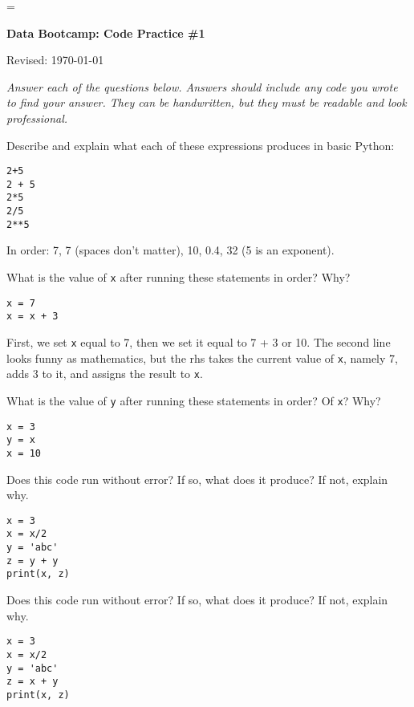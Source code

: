 \documentclass[11pt]{exam}
\begin{document}
\parskip=\bigskipamount
\parindent=0.0in
\thispagestyle{empty}


\bigskip\bigskip
\centerline{\Large \bf Data Bootcamp:  Code Practice \#1}
\centerline{Revised: \today}

{\it Answer each of the questions below.
Answers should include any code you wrote to find your answer.
They can be handwritten, but they must be readable and look professional.}

\begin{questions}
\item Describe and explain what each of these expressions produces in basic Python:
\begin{verbatim}
2+5
2 + 5
2*5
2/5
2**5
\end{verbatim}

\begin{solution}
In order:  7, 7 (spaces don't matter), 10, 0.4, 32 (5 is an exponent).
\end{solution}

\item What is the value of \texttt{x} after running these statements in order? Why?
\begin{verbatim}
x = 7
x = x + 3
\end{verbatim}

\begin{solution}
First, we set {\tt x} equal to 7, then we set it equal to 7 + 3 or 10.
The second line looks funny as mathematics, but the rhs takes the current value of {\tt x}, namely 7,
adds 3 to it, and assigns the result to {\tt x}.
\end{solution}

\item What is the value of \texttt{y} after running these statements in order?
Of \texttt{x}?  Why?
\begin{verbatim}
x = 3
y = x
x = 10
\end{verbatim}

\item Does this code run without error?  If so, what does it produce?  If not, explain why.
\begin{verbatim}
x = 3
x = x/2
y = 'abc'
z = y + y
print(x, z)
\end{verbatim}

\item Does this code run without error?  If so, what does it produce?  If not, explain why.
\begin{verbatim}
x = 3
x = x/2
y = 'abc'
z = x + y
print(x, z)
\end{verbatim}


\end{questions}
\end{document}
